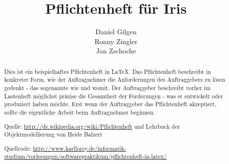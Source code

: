 \documentclass[a4paper, 12pt, oneside]{report}
\begin{document}
  
 
\title{\textbf{Pflichtenheft für Iris}}
\author{Daniel Gilgen\\ Ronny Zingler \\ Jan Zschoche}
\maketitle
 
\begin{abstract}
Dies ist ein beispielhaftes Pflichtenheft in \LaTeX. Das Pflichtenheft
beschreibt in konkreter Form, wie der Auftragnehmer die Anforderungen des
Auftraggebers zu lösen gedenkt - das sogenannte wie und womit. Der Auftraggeber
beschreibt vorher im Lastenheft möglichst präzise die Gesamtheit der
Forderungen - was er entwickelt oder produziert haben möchte. Erst wenn der
Auftraggeber das Pflichtenheft akzeptiert, sollte die eigentliche Arbeit beim
Auftragnehmer beginnen.
\vspace{1cm}
 
Quelle: \url{http://de.wikipedia.org/wiki/Pflichtenheft} und Lehrbuch der
Objektmodellierung von Heide Balzert
\vspace{0.5cm}
 
Quellcode: \url{http://www.karllorey.de/informatik-studium/vorlesungen/softwarepraktikum/pflichtenheft-in-latex/}
\end{abstract}
 
\tableofcontents
\pagestyle{fancy}





 
 
 



 
\listoffigures
 
\end{document}
